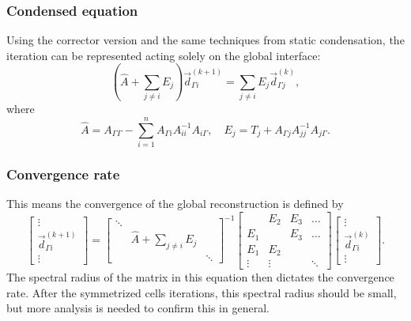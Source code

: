 \documentclass{beamer}
\begin{document}
\begin{frame}
\frametitle{Condensed equation}

Using the corrector version and the same techniques from static condensation, the iteration can be represented acting solely on the global interface:
\begin{equation*}
	\left ( \hat{A} + \sum_{j \neq i} E_j \right ) \vec{d}_{\Gamma i}^{(k+1)} = \sum_{j \neq i} E_j \vec{d}_{\Gamma j}^{(k)},
\end{equation*}
where
\begin{equation*}
	\hat{A} = A_{\Gamma \Gamma} - \sum_{i=1}^n A_{\Gamma i} A_{ii}^{-1} A_{i \Gamma}, \quad E_j = T_j + A_{\Gamma j} A_{jj}^{-1} A_{j \Gamma}.
\end{equation*}

\end{frame}

\begin{frame}
\frametitle{Convergence rate}

This means the convergence of the global reconstruction is defined by
\begin{equation*}
	\begin{bmatrix} \vdots \\ \vec{d}_{\Gamma i}^{(k+1)} \\ \vdots \end{bmatrix}
	=
	\begin{bmatrix} \ddots \\ & \hat{A} + \sum_{j \neq i} E_j \\ & & \ddots \end{bmatrix}^{-1}
	\begin{bmatrix} & E_2 & E_3 & \dots \\ E_1 & & E_3 & \dots \\ E_1 & E_2 \\ \vdots & \vdots & & \ddots \end{bmatrix}
	\begin{bmatrix} \vdots \\ \vec{d}_{\Gamma i}^{(k)} \\ \vdots \end{bmatrix}.
\end{equation*}
The spectral radius of the matrix in this equation then dictates the convergence rate.
After the symmetrized cells iterations, this spectral radius should be small, but more analysis is needed to confirm this in general.

\end{frame}
\end{document}
